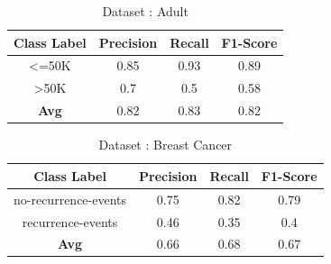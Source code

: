 \documentclass[12pt]{article}
\begin{document}
\begin{table}[H]
	\caption{Dataset : Adult}
	\centering
	\begin{tabular}{|c|c|c|c|}
		\hline
		\textbf{Class Label} & \textbf{Precision} & \textbf{Recall} & \textbf{F1-Score} \\ \hline
		\textless{}=50K      & 0.85               & 0.93            & 0.89              \\ \hline
		\textgreater{}50K    & 0.7                & 0.5             & 0.58              \\ \hline
		\textbf{Avg}         & 0.82               & 0.83            & 0.82              \\ \hline
	\end{tabular}
\end{table}

\begin{table}[H]
	\caption{Dataset : Breast Cancer}
	\centering
	\begin{tabular}{|c|c|c|c|}
		\hline
		\textbf{Class Label} & \textbf{Precision} & \textbf{Recall} & \textbf{F1-Score} \\ \hline
		no-recurrence-events & 0.75               & 0.82            & 0.79              \\ \hline
		recurrence-events    & 0.46               & 0.35            & 0.4               \\ \hline
		\textbf{Avg}         & 0.66               & 0.68            & 0.67              \\ \hline
	\end{tabular}
\end{table}
\end{document}
